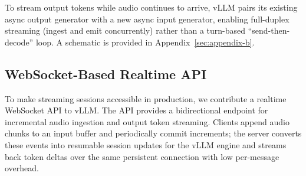To stream output tokens while audio continues to arrive, vLLM pairs its existing async output generator with a new async input generator, enabling full-duplex streaming (ingest and emit concurrently) rather than a turn-based ``send-then-decode'' loop. A schematic is provided in Appendix~\ref{sec:appendix-b}.

\subsection{WebSocket-Based Realtime API}

To make streaming sessions accessible in production, we contribute a realtime WebSocket API to vLLM. The API provides a bidirectional endpoint for incremental audio ingestion and output token streaming. Clients append audio chunks to an input buffer and periodically commit increments; the server converts these events into resumable session updates for the vLLM engine and streams back token deltas over the same persistent connection with low per-message overhead. 
